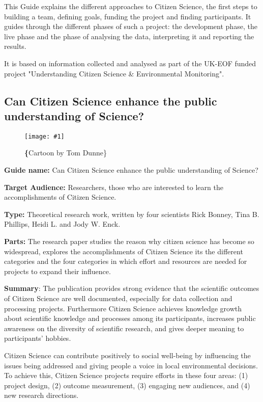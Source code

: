 \documentclass{article}
\newlength{\imgwidth}
\newcommand\scaledgraphics[2]{%
                
\settowidth{\imgwidth}{\texttt{[image: \#1]}}%
                
\setlength{\imgwidth}{\minof{\imgwidth}{#2\textwidth}}%
                
\texttt{[image: \#1]}%
                
}
\begin{document}
This Guide explains the different approaches to Citizen Science, the first steps to building a team, defining goals, funding the project and finding participants. It guides through the different phases of such a project: the development phase, the live phase and the phase of analysing the data, interpreting it and reporting the results.


It is based on information collected and analysed as part of the UK-EOF funded project "Understanding Citizen Science \& Environmental Monitoring".


\subsection{Can Citizen Science enhance the public understanding of Science?}\label{H2333653}



\begin{center}
\begin{figure}
\scaledgraphics{fb9872a4-8371-4bfe-a930-f1d621c5649e.png}{0.5}
\caption*{\textbf\{Cartoon by Tom Dunne\}}\label{F26530171}
\end{figure}


\end{center}





\textbf{Guide name: }Can Citizen Science enhance the public understanding of Science?\textbf{ } \autocite{bonney_can_2015}


\textbf{Target Audience: }Researchers, those who are interested to learn the accomplishments of Citizen Science.


\textbf{Type: }Theoretical research work, written by four scientists Rick Bonney, Tina B. Phillips, Heidi L. and Jody W. Enck.


\textbf{Parts: }The research paper studies the reason why citizen science has become so widespread, explores the accomplishments of Citizen Science its the different categories and the four categories in which effort and resources are needed for projects to expand their influence.


\textbf{Summary}: The publication provides strong evidence that the scientific outcomes of Citizen Science are well documented, especially for data collection and processing projects. Furthermore Citizen Science achieves knowledge growth about scientific knowledge and processes among its participants, increases public awareness on the diversity of scientific research, and gives deeper meaning to participants' hobbies.


Citizen Science can contribute positively to social well-being by influencing the issues being addressed and giving people a voice in local environmental decisions. To achieve this, Citizen Science projects require efforts in these four areas: (1) project design, (2) outcome measurement, (3) engaging new audiences, and (4) new research directions.


\printbibliography[title={Bibliography}]
\end{document}
